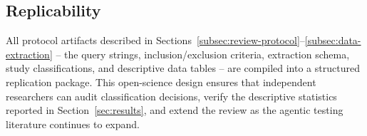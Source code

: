 \subsection{Replicability}
\label{subsec:replicability}
All protocol artifacts described in Sections~\ref{subsec:review-protocol}--\ref{subsec:data-extraction} --
the query strings, inclusion/exclusion criteria, extraction schema, study classifications,
and descriptive data tables -- are compiled into a structured replication package.
This open-science design ensures that independent researchers can audit classification
decisions, verify the descriptive statistics reported in Section~\ref{sec:results}, and
extend the review as the agentic testing literature continues to expand.

